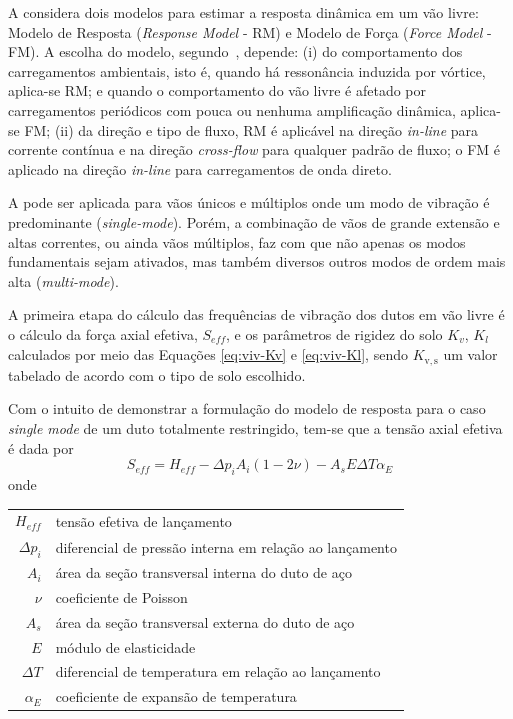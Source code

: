 A  considera dois modelos para estimar a resposta dinâmica em um vão livre: Modelo de Resposta (\textit{Response Model} - RM) e Modelo de Força (\textit{Force Model} - FM).
A escolha do modelo, segundo~, depende: (i) do comportamento dos carregamentos ambientais, isto é, quando há ressonância induzida por vórtice, aplica-se RM; e quando o comportamento do vão livre é afetado por carregamentos periódicos com pouca ou nenhuma amplificação dinâmica, aplica-se FM; (ii) da direção e tipo de fluxo, RM é aplicável na direção \textit{in-line} para corrente contínua e na direção \textit{cross-flow} para qualquer padrão de fluxo; o FM é aplicado na direção \textit{in-line} para carregamentos de onda direto.

A  pode ser aplicada para vãos únicos e múltiplos onde um modo de vibração é predominante (\textit{single-mode}).
Porém, a combinação de vãos de grande extensão e altas correntes, ou ainda vãos múltiplos, faz com que não apenas os modos fundamentais sejam ativados, mas também diversos outros modos de ordem mais alta (\textit{multi-mode}).

A primeira etapa do cálculo das frequências de vibração dos dutos em vão livre é o cálculo da força axial efetiva, $S_\mathit{eff}$, e os parâmetros de rigidez do solo $K_v$, $K_l$ calculados por meio das Equações \ref{eq:viv-Kv} e \ref{eq:viv-Kl}, sendo $K_\mathrm{v,s}$ um valor tabelado de acordo com o tipo de solo escolhido.

Com o intuito de demonstrar a formulação do modelo de resposta para o caso \textit{single mode} de um duto totalmente restringido, tem-se que a tensão axial efetiva é dada por
\begin{equation}
\label{eq:viv-Seff}
S_\mathit{eff} = H_\mathit{eff} - \Delta p_i A_i (1 - 2\nu) - A_s E \Delta T \alpha_E
\end{equation}
onde

\begin{tabular}{rl}
$H_\mathit{eff}$ & tensão efetiva de lançamento\\
$\Delta p_i$     & diferencial de pressão interna em relação ao lançamento\\
$A_i$            & área da seção transversal interna do duto de aço\\
$\nu$            & coeficiente de Poisson\\
$A_s$            & área da seção transversal externa do duto de aço\\
$E$              & módulo de elasticidade\\
$\Delta T$       & diferencial de temperatura em relação ao lançamento\\
$\alpha_E$       & coeficiente de expansão de temperatura
\end{tabular}


